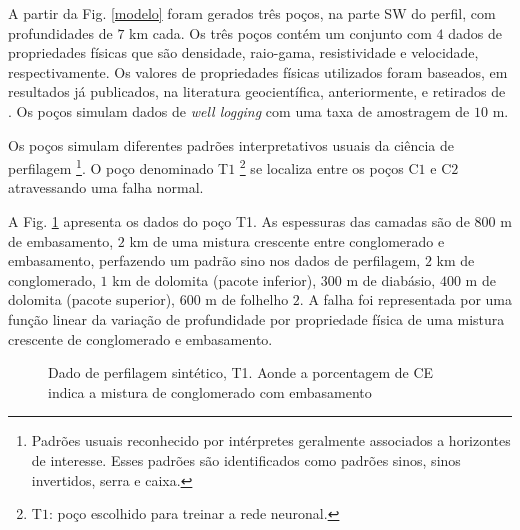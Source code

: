 A partir da Fig. \ref{modelo} foram gerados três poços, na parte SW do perfil, com profundidades de $7$ km cada. Os três poços contém um conjunto com $4$ dados de propriedades físicas que são densidade, raio-gama, resistividade e velocidade, respectivamente. Os valores de propriedades físicas utilizados foram  baseados, em resultados já publicados, na literatura geocientífica, anteriormente, e retirados de \citet{Telford_1993}. Os poços simulam dados de \textit{well logging} com uma taxa de amostragem de $10$ m.

Os poços simulam diferentes padrões interpretativos usuais da ciência de perfilagem \footnote{Padrões usuais reconhecido por intérpretes geralmente associados a horizontes de interesse. Esses padrões são identificados como padrões sinos, sinos invertidos, serra e caixa.}. O poço denominado T$1$ \footnote{T$1$: poço escolhido para treinar a rede neuronal.} se localiza entre os poços C$1$ e C$2$ atravessando uma falha normal. 

A Fig. \ref{T1} apresenta os dados do poço T1. As espessuras das camadas são de $800$ m de embasamento, $2$ km de uma mistura crescente entre conglomerado e embasamento, perfazendo um padrão sino nos dados de perfilagem, $2$ km de conglomerado, $1$ km de dolomita (pacote inferior), $300$ m de diabásio, $400$ m de dolomita (pacote superior), $600$ m de folhelho $2$. A falha foi representada por uma função linear da variação de profundidade por propriedade física de uma mistura crescente de conglomerado e embasamento.

\begin{figure}[H]
	\centering
	\setlength{\fboxsep}{8pt}
	\setlength{\fboxrule}{0.1pt}
	\caption{Dado de perfilagem sintético, T1. Aonde a porcentagem de CE indica a mistura de conglomerado com embasamento}
	\label{T1}
\end{figure}

